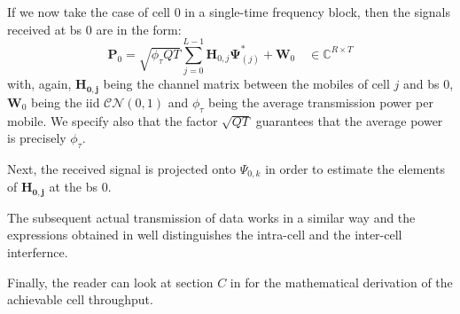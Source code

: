 \documentclass[11pt]{book}
\begin{document}
If we now take the case of cell $0$ in a single-time frequency block, then the signals received at \gls{bs} $0$ are in the form:
\begin{equation}
  \mathbf{P}_0 = \sqrt{\phi_{\tau} QT}\sum_{j=0}^{L-1}\mathbf{H}_{0,j}\mathbf{\Psi}_{(j)}^* + \mathbf{W}_0 \quad \in \mathbb{C}^{R\times T}
\end{equation}
with, again, $\mathbf{H_{0,j}}$ being the channel matrix between the mobiles of cell $j$ and \gls{bs} $0$, $\mathbf{W}_0$ being the iid $\mathcal{CN}(0,1)$ and $\phi_{\tau}$ being the average transmission power per mobile. We specify also that the factor $\sqrt{QT}$ guarantees that the average power is precisely $\phi_{\tau}$.

Next, the received signal is projected onto $\Psi_{0,k}$ in order to estimate the elements of $\mathbf{H_{0,j}}$ at the \gls{bs} $0$.

The subsequent actual transmission of data works in a similar way and the expressions obtained in \cite{Ahsan2016} well distinguishes the intra-cell and the inter-cell interfernce.

Finally, the reader can look at section $C$ in \cite{Ahsan2016} for the mathematical derivation of the achievable cell throughput.
\end{document}
